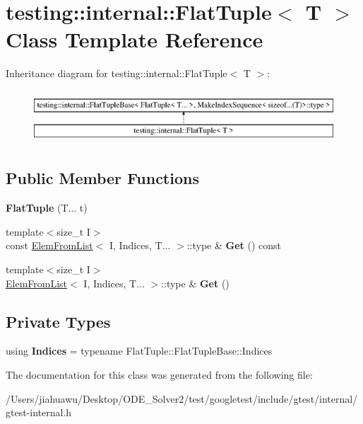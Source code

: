 \hypertarget{classtesting_1_1internal_1_1_flat_tuple}{}\section{testing\+:\+:internal\+:\+:Flat\+Tuple$<$ T $>$ Class Template Reference}
\label{classtesting_1_1internal_1_1_flat_tuple}
Inheritance diagram for testing\+:\+:internal\+:\+:Flat\+Tuple$<$ T $>$\+:\begin{figure}[H]
\begin{center}
\leavevmode
\includegraphics[height=2.000000cm]{classtesting_1_1internal_1_1_flat_tuple}
\end{center}
\end{figure}
\subsection*{Public Member Functions}
\begin{DoxyCompactItemize}
\item 
\mbox{\label{classtesting_1_1internal_1_1_flat_tuple_a611d01b9ff2437e4b9cfe3bbedc6d6ae}} 
{\bfseries Flat\+Tuple} (T... t)
\item 
\mbox{\label{classtesting_1_1internal_1_1_flat_tuple_a9ea6508fa6413ceca5e38b8077c67938}} 
{\footnotesize template$<$size\+\_\+t I$>$ }\\const \mbox{\hyperlink{structtesting_1_1internal_1_1_elem_from_list}{Elem\+From\+List}}$<$ I, Indices, T... $>$\+::type \& {\bfseries Get} () const
\item 
\mbox{\label{classtesting_1_1internal_1_1_flat_tuple_a48a13560f8963f727d81a7922e3b3e50}} 
{\footnotesize template$<$size\+\_\+t I$>$ }\\\mbox{\hyperlink{structtesting_1_1internal_1_1_elem_from_list}{Elem\+From\+List}}$<$ I, Indices, T... $>$\+::type \& {\bfseries Get} ()
\end{DoxyCompactItemize}
\subsection*{Private Types}
\begin{DoxyCompactItemize}
\item 
\mbox{\label{classtesting_1_1internal_1_1_flat_tuple_a004b42fc11ac1a85a9b1560fa83cdf77}} 
using {\bfseries Indices} = typename Flat\+Tuple\+::\+Flat\+Tuple\+Base\+::\+Indices
\end{DoxyCompactItemize}


The documentation for this class was generated from the following file\+:\begin{DoxyCompactItemize}
\item 
/\+Users/jiahuawu/\+Desktop/\+O\+D\+E\+\_\+\+Solver2/test/googletest/include/gtest/internal/gtest-\/internal.\+h\end{DoxyCompactItemize}
